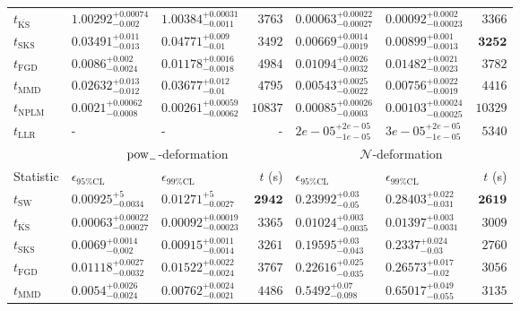 \begin{tabular}{l|llr|llr}
	$t_{\overline{\mathrm{KS}}}$ & $1.00292_{-0.002}^{+0.00074}$ & $1.00384_{-0.0011}^{+0.00031}$ & $3763$ & ${\mathbf{0.00063_{-0.00027}^{+0.00022}}}$ & ${\mathbf{0.00092_{-0.00023}^{+0.0002}}}$ & $3366$ \\
	$t_{\mathrm{SKS}}$ & $0.03491_{-0.013}^{+0.011}$ & $0.04771_{-0.01}^{+0.009}$ & $3492$ & $0.00669_{-0.0019}^{+0.0014}$ & $0.00899_{-0.0013}^{+0.001}$ & ${\mathbf{3252}}$ \\
	$t_{\mathrm{FGD}}$ & ${\mathbf{0.0086_{-0.0024}^{+0.002}}}$ & ${\mathbf{0.01178_{-0.0018}^{+0.0016}}}$ & $4984$ & $0.01094_{-0.0032}^{+0.0026}$ & $0.01482_{-0.0023}^{+0.0021}$ & $3782$ \\
	$t_{\mathrm{MMD}}$ & $0.02632_{-0.012}^{+0.013}$ & $0.03677_{-0.01}^{+0.012}$ & $4795$ & $0.00543_{-0.0022}^{+0.0025}$ & $0.00756_{-0.0019}^{+0.0022}$ & $4416$ \\
\rowcolor{red!35}	$t_{\mathrm{NPLM}}$ & $0.0021_{-0.0008}^{+0.00062}$ & $0.00261_{-0.00062}^{+0.00059}$ & $10837$ & $0.00085_{-0.0003}^{+0.00026}$ & $0.00103_{-0.00025}^{+0.00024}$ & $10329$ \\
	$t_{\mathrm{LLR}}$ & - & - & - & $2e-05_{-1e-05}^{+2e-05}$ & $3e-05_{-1e-05}^{+2e-05}$ & $5340$ \\
	\toprule
	\multicolumn{1}{c}{} & \multicolumn{3}{c}{$\rm{pow}_{-}$-deformation} & \multicolumn{3}{c}{$\mathcal{N}$-deformation} \\
	Statistic & $\epsilon_{95\%\mathrm{CL}}$ & $\epsilon_{99\%\mathrm{CL}}$ & $t$ (s) & $\epsilon_{95\%\mathrm{CL}}$ & $\epsilon_{99\%\mathrm{CL}}$ & $t$ (s) \\
	\midrule
	$t_{\mathrm{SW}}$ & $0.00925_{-0.0034}^{+5}$ & $0.01271_{-0.0027}^{+5}$ & ${\mathbf{2942}}$ & $0.23992_{-0.05}^{+0.03}$ & $0.28403_{-0.031}^{+0.022}$ & ${\mathbf{2619}}$ \\
	$t_{\overline{\mathrm{KS}}}$ & ${\mathbf{0.00063_{-0.00027}^{+0.00022}}}$ & ${\mathbf{0.00092_{-0.00023}^{+0.00019}}}$ & $3365$ & ${\mathbf{0.01024_{-0.0035}^{+0.003}}}$ & ${\mathbf{0.01397_{-0.0031}^{+0.003}}}$ & $3009$ \\
	$t_{\mathrm{SKS}}$ & $0.0069_{-0.002}^{+0.0014}$ & $0.00915_{-0.0014}^{+0.0011}$ & $3261$ & $0.19595_{-0.043}^{+0.03}$ & $0.2337_{-0.03}^{+0.024}$ & $2760$ \\
	$t_{\mathrm{FGD}}$ & $0.01118_{-0.0032}^{+0.0027}$ & $0.01522_{-0.0024}^{+0.0022}$ & $3767$ & $0.22616_{-0.035}^{+0.025}$ & $0.26573_{-0.02}^{+0.017}$ & $3056$ \\
	$t_{\mathrm{MMD}}$ & $0.0054_{-0.0024}^{+0.0026}$ & $0.00762_{-0.0021}^{+0.0024}$ & $4486$ & $0.5492_{-0.098}^{+0.07}$ & $0.65017_{-0.055}^{+0.049}$ & $3135$ \\

\end{tabular}

